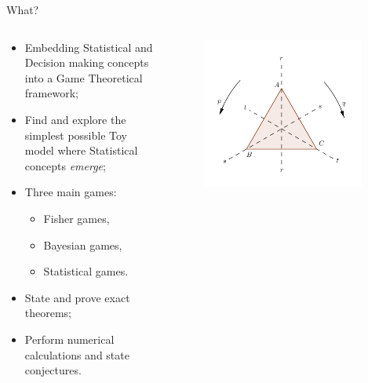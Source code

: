 \documentclass{beamer}
\theoremstyle{definition}
\begin{document}
\begin{frame}{What?}



\begin{columns}

\begin{column}{0.7\textwidth}
            
\begin{itemize}
    \item Embedding Statistical and Decision making concepts into a Game Theoretical framework;
    \item Find and explore the simplest possible Toy model where Statistical concepts \emph{emerge};
    \item Three main games:
    \begin{itemize}
        \item Fisher games,
        \item Bayesian games,
        \item Statistical games.
    \end{itemize}
    \item State and prove exact theorems;
    \item Perform numerical calculations and state conjectures.
\end{itemize}

\end{column}

\begin{column}{0.3\textwidth}
    \begin{figure}
    \centering
        \includegraphics[width=0.95\textwidth]{img/SymmetryGroupEqTriangle_alpha.png}
    \end{figure}


\end{column}
\end{columns}
\end{frame}
\end{document}
